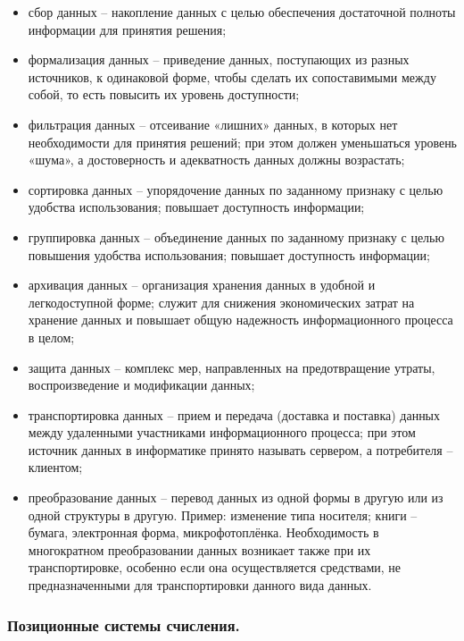 \documentclass[a4paper]{article}
\begin{document}
\begin{itemize}
\item сбор данных – накопление данных с целью обеспечения достаточной полноты информации для принятия решения;

\item формализация данных – приведение данных, поступающих из разных источников, к одинаковой форме, чтобы сделать их сопоставимыми между собой, то есть повысить их уровень доступности;

\item фильтрация данных – отсеивание «лишних» данных, в которых нет необходимости для принятия решений; при этом должен уменьшаться уровень «шума», а достоверность и адекватность данных должны возрастать;

\item сортировка данных – упорядочение данных по заданному признаку с целью удобства использования; повышает доступность информации;

\item группировка данных – объединение данных по заданному признаку с целью повышения удобства использования; повышает доступность информации;

\item архивация данных – организация хранения данных в удобной и легкодоступной форме; служит для снижения экономических затрат на хранение данных и повышает общую надежность информационного процесса в целом;

\item защита данных – комплекс мер, направленных на предотвращение утраты, воспроизведение и модификации данных;

\item транспортировка данных – прием и передача (доставка и поставка) данных между удаленными участниками информационного процесса; при этом источник данных в информатике принято называть сервером, а потребителя – клиентом;

\item преобразование данных – перевод данных из одной формы в другую или из одной структуры в другую. Пример: изменение типа носителя; книги – бумага, электронная форма, микрофотоплёнка. Необходимость в многократном преобразовании данных возникает также при их транспортировке, особенно если она осуществляется средствами, не предназначенными для транспортировки данного вида данных.

\end{itemize}


\subsubsection{Позиционные системы счисления.}
\end{document}

